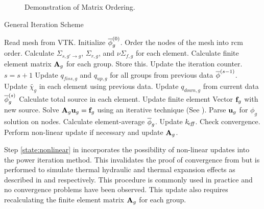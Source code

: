     \begin{figure}
      \centering
      \hspace{0.1in}
      \caption{Demonstration of  Matrix Ordering.}
      \label{fig:sparsity_pattern}
    \end{figure}
    
    \begin{algorithm}
      \caption{General Iteration Scheme}
      \label{algorithm:general}
      \begin{algorithmic}[1]
      \State Read mesh from VTK.
      \State Initialize $\overline{\phi}_g^{(0)}$.
      \State Order the nodes of the mesh into \gls{rcm} order.
        \label{state:rcm}
      \State Calculate $\Sigma_{s,g'\rightarrow g}$, $\Sigma_{r,g}$, and 
        $\nu \Sigma_{f,g}$ for each element.
      \State Calculate finite element matrix $\mathbf{A}_g$ for each group. Store this. 
        \label{state:fem_matrix}
        \State Update the iteration counter. $s=s+1$
        \State Update $q_{fiss,g}$ and $q_{up,g}$ for all groups from previous 
          data $\overline{\phi}^{(s-1)}$.
        \State Update $\widetilde{\chi_g}$ in each element using previous data.
          \label{state:chi_collapse}
          \State Update $q_{down,g}$ from current data $\overline{\phi}_g^{(s)}$
          \State Calculate total source in each element.
          \State Update finite element Vector $\mathbf{f}_g$ with new source.
            \label{state:fem_vector}
          \State Solve $\mathbf{A}_g \mathbf{u}_g = \mathbf{f}_g$ using an iterative technique (See
            ).
          \State Parse $\mathbf{u}_g$ for $\phi_g$ solution on nodes.
          \State Calculate element-average $\overline{\phi}_g$.
        \EndFor
        \State Update $k_{\!\mbox{\scriptsize \em eff}}$.
        \State Check convergence.
        \State Perform non-linear update if necessary and update $\mathbf{A}_g$. 
          \label{state:nonlinear}
      \EndWhile
      \end{algorithmic}
    \end{algorithm}

    Step \ref{state:nonlinear} in  incorporates
    the possibility of non-linear updates into the power iteration method. This
    invalidates the proof of convergence from  but is
    performed to simulate thermal hydraulic and thermal expansion effects as
    described in  and 
    respectively. This procedure is commonly used in practice and no convergence 
    problems have been observed. This update also requires recalculating the 
    finite element matrix $\mathbf{A}_g$ for each group.
    
